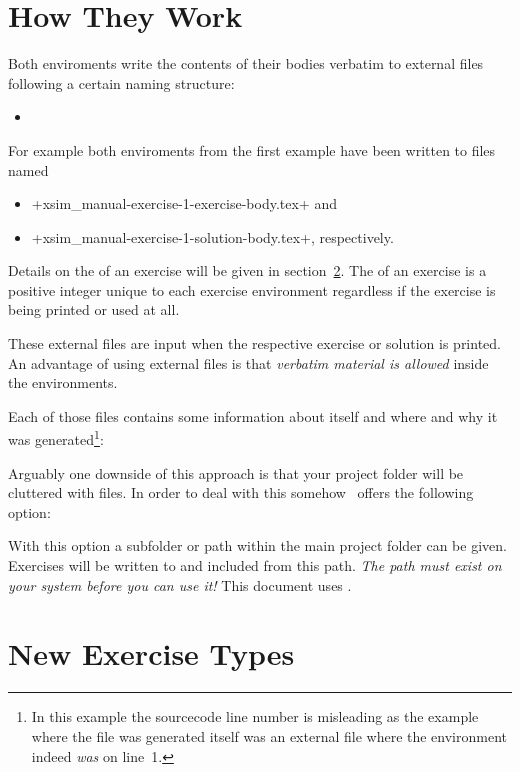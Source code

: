 \documentclass[load-preamble+]{cnltx-doc}
\begin{document}
\section{How They Work}
Both enviroments write the contents of their bodies verbatim to external files
following a certain naming structure:
\begin{itemize}
  \item
\end{itemize}
For example both enviroments from the first example have been written to files
named
\begin{itemize}
  \item \verbcode+xsim_manual-exercise-1-exercise-body.tex+ and
  \item \verbcode+xsim_manual-exercise-1-solution-body.tex+, respectively.
\end{itemize}
Details on the  of an exercise will be given in
section~\ref{sec:new-exercise-types}. The  of an exercise is a
positive integer unique to each exercise environment regardless if the
exercise is being printed or used at all.

These external files are input when the respective exercise or solution is
printed.  An advantage of using external files is that \emph{verbatim material
  is allowed} inside the environments.

Each of those files contains some information about itself and where and why
it was generated\footnote{In this example the sourcecode line number is
  misleading as the example where the file was generated itself was an
  external file where the  environment indeed \emph{was} on
  line~1.}:


Arguably one downside of this approach is that your project folder will be
cluttered with files.  In order to deal with this somehow \xsim\ offers the
following option:
\begin{options}
  \Default
    With this option a subfolder or path within the main project folder can be
    given.  Exercises will be written to and included from this path.
    \emph{The path must exist on your system before you can use it!} This
    document uses .
\end{options}

\section{New Exercise Types}\label{sec:new-exercise-types}
\end{document}
